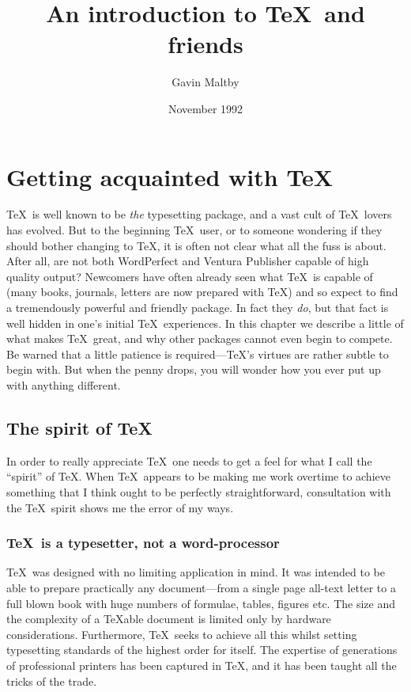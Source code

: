 \title{An introduction to \TeX\ and friends}
\author{Gavin Maltby}
\date{November 1992}

\maketitle
\tableofcontents
\listoftables
\newpage
{}

\chapter{Getting acquainted with \TeX}
\TeX\ is well known to be {\em the\/} typesetting package,
and a vast cult of \TeX\ lovers has evolved.  But to the beginning
\TeX\ user, or to someone wondering if they should bother changing
to \TeX, it is often not clear what all the fuss is about.  After all,
are not both WordPerfect and Ventura Publisher capable of
high quality output?  Newcomers have often already seen what \TeX\
is capable of (many books, journals, letters are now prepared with \TeX)
and so expect to find a tremendously powerful and friendly package.
In fact they {\em do}, but that fact is well hidden in one's initial
\TeX\ experiences.  In this chapter we describe a little of what
makes \TeX\ great, and why other packages cannot even begin
to compete.  Be warned that a little patience is required---\TeX's
virtues are rather subtle to begin with.  But when the penny drops,
you will wonder how you ever put up with anything different.

\section{The spirit of \TeX}
In order to really appreciate \TeX\ one needs to get a feel
for what I call the ``spirit'' of \TeX.  When \TeX\
appears to be making me work overtime to achieve something
that I think ought to be perfectly straightforward, consultation
with the \TeX\ spirit shows me the error of my ways.

\subsection{\TeX\ is a typesetter, not a word-processor}
\TeX\ was designed with no limiting application in mind.
It was intended to be able to prepare practically any document---from
a single page all-text letter to a full blown book with huge numbers
of formulae, tables, figures etc.  The size and the complexity of a
{\TeX}able document is limited only by hardware considerations.
Furthermore, \TeX\ seeks to achieve all this whilst setting
typesetting standards of the highest order for itself.  The expertise
of generations of professional printers has been captured in
\TeX, and it has been taught all the tricks of the trade.

